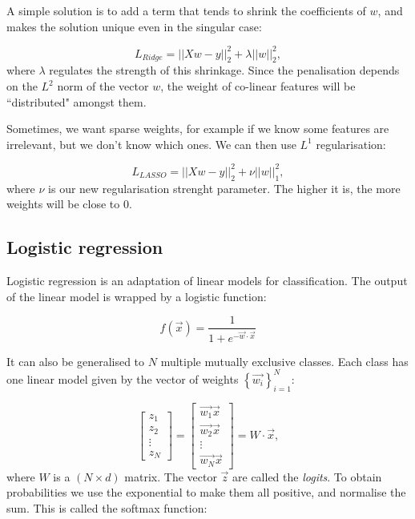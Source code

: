A simple solution  is to add a term that tends to shrink the coefficients of $w$, and makes the solution unique even in the singular case:

\[ L_{Ridge} = || X w -y ||_2 ^2 + \lambda ||w||_2^2,\]
where $\lambda$ regulates the strength of this shrinkage.
Since the penalisation depends on the $L^2$ norm of the vector $w$, the weight of co-linear features will be ``distributed" amongst them.

Sometimes, we want sparse weights,  for example if we know some features are irrelevant, but we don't know which ones.
We can then use $L^1$ regularisation:

\[ L_{LASSO} = || X w -y ||_2 ^2 + \nu ||w||_1^2,\]
where $\nu$ is our new regularisation strenght parameter.
The higher it is, the more weights will be close to $0$.


\subsection{Logistic regression}
Logistic regression  is an adaptation of linear models for classification.
The output of the linear model is wrapped by a logistic function:

\begin{equation*}
f(\vec x) = \frac{1}{1 + e^{- \vec{w} \cdot \vec x}}
\end{equation*}

It can also be generalised to $N$ multiple mutually exclusive classes.
Each class has one linear model given by the vector of weights $\left\{\vec{w_i}\right\}_{i=1} ^N$:

\begin{equation*}
\begin{bmatrix}z_1 \\ z_2 \\ \vdots \\ z_N\end{bmatrix} = 
\begin{bmatrix}
\vec{w_1} \vec{x} \\ \vec{w_2} \vec{x} \\ \vdots \\ \vec{w_N} \vec{x}
\end{bmatrix} = 
W \cdot \vec{x},
\end{equation*}
where $W$ is a $(N \times d)$ matrix.
The vector $\vec{z}$ are called the \emph{logits}. 
To obtain probabilities we use the exponential to make them all positive, and normalise the sum.
This is called the softmax function:

